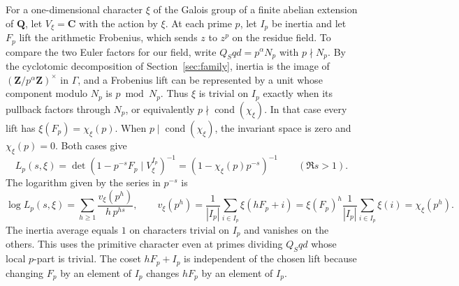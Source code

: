 For a one-dimensional character \(\xi\) of the Galois group of a finite
abelian extension of \(\mathbf Q\), let \(V_\xi=\mathbf C\) with the action by
\(\xi\). At each prime \(p\), let \(I_p\) be inertia and let \(F_p\)
lift the arithmetic Frobenius, which sends \(z\) to \(z^p\) on the
residue field. To compare the two Euler factors for our field, write
\(Q_Sqd=p^\alpha N_p\) with \(p\nmid N_p\).
By the cyclotomic decomposition of Section~\ref{sec:family}, inertia
is the image of \((\mathbf Z/p^\alpha\mathbf Z)^\times\) in \(\Gamma\),
and a Frobenius lift can be represented by a unit whose component
modulo \(N_p\) is \(p\bmod N_p\).
Thus \(\xi\) is trivial on \(I_p\) exactly when its pullback factors
through \(N_p\), or equivalently \(p\nmid\operatorname{cond}(\chi_\xi)\).
In that case every lift has \(\xi(F_p)=\chi_\xi(p)\).
When \(p\mid\operatorname{cond}(\chi_\xi)\), the invariant space
is zero and \(\chi_\xi(p)=0\). Both cases give
\[
 L_p(s,\xi)=\det\!\left(1-p^{-s}F_p\mid V_\xi^{I_p}\right)^{-1}
           =\left(1-\chi_\xi(p)p^{-s}\right)^{-1}
           \qquad(\Re s>1).
\]
The logarithm given by the series in \(p^{-s}\) is
\[
 \log L_p(s,\xi)=\sum_{h\ge1}\frac{v_\xi(p^h)}{h\,p^{hs}},
 \qquad
 v_\xi(p^h)=\frac{1}{|I_p|}\sum_{i\in I_p}\xi(hF_p+i)
           =\xi(F_p)^h\frac{1}{|I_p|}\sum_{i\in I_p}\xi(i)
           =\chi_\xi(p^h).
\]
The inertia average equals \(1\) on characters trivial on \(I_p\)
and vanishes on the others. This uses the primitive character even at
primes dividing \(Q_Sqd\) whose local \(p\)-part is trivial.
The coset \(hF_p+I_p\) is independent of the chosen lift because
changing \(F_p\) by an element of \(I_p\) changes \(hF_p\) by an
element of \(I_p\).
\cite[(3.2)--(3.5), (3.15), and \S4.2]{deshalit-artin}

